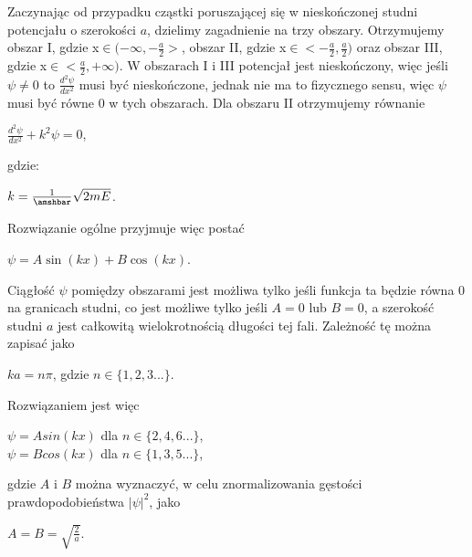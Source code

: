 \documentclass{SGGW-thesis}
\begin{document}
	Zaczynając od przypadku cząstki poruszającej się w nieskończonej studni potencjału o szerokości $a$, dzielimy zagadnienie na trzy obszary. Otrzymujemy obszar I, gdzie x$\in(-\infty,-\frac{a}{2}>$, obszar II, gdzie x$\in<-\frac{a}{2}, \frac{a}{2})$ oraz obszar III, gdzie x$\in<\frac{a}{2}, +\infty)$. W obszarach I i III potencjał jest nieskończony, więc jeśli $\psi\neq0$ to $\frac{d^2\psi}{dx^2}$ musi być nieskończone, jednak nie ma to fizycznego sensu, więc $\psi$ musi być równe 0 w tych obszarach. Dla obszaru II otrzymujemy równanie
\begin{center}
$\frac{d^2\psi}{dx^2}+k^2\psi=0$,
\end{center}
gdzie:
\begin{center}
$k=\frac{1}{\amshbar}\sqrt{2mE}$.
\end{center}
Rozwiązanie ogólne przyjmuje więc postać
\begin{center}
$\psi=A\sin(kx) + B\cos(kx)$. \color{red}{Czemu inne niż dla cząstki swobodnej?}
\end{center}
Ciągłość $\psi$ pomiędzy obszarami jest możliwa tylko jeśli funkcja ta będzie równa 0 na granicach studni, co jest możliwe tylko jeśli $A=0$ lub $B=0$, a szerokość studni $a$ jest całkowitą wielokrotnością długości tej fali. Zależność tę można zapisać jako
\begin{center}
$ka=n\pi$, \;\;gdzie $n\in\{1, 2, 3...\}$.
\end{center}
Rozwiązaniem jest więc
\begin{center}
$\psi = Asin(kx)$ dla $n\in\{2, 4, 6...\}$,\\
$\psi = Bcos(kx)$ dla $n\in\{1, 3, 5...\}$,
\end{center}
gdzie $A$ i $B$ można wyznaczyć, w celu znormalizowania gęstości prawdopodobieństwa $|\psi|^2$, jako
\begin{center}
$A=B=\sqrt{\frac{2}{a}}$.
\end{center}
\end{document}
